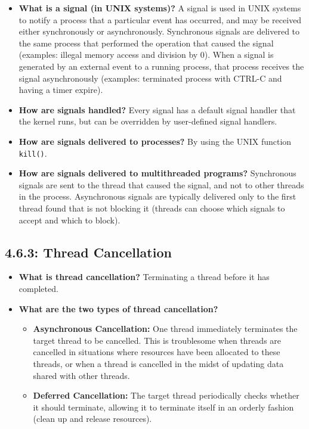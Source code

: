 \documentclass[12pt]{article}
\begin{document}
\begin{itemize}
    \item \textbf{What is a signal (in UNIX systems)?} A signal is used in UNIX systems to notify a process that a particular event has occurred, and may be received either synchronously or asynchronously. Synchronous signals are delivered to the same process that performed the operation that caused the signal (examples: illegal memory access and division by 0). When a signal is generated by an external event to a running process, that process receives the signal asynchronously (examples: terminated process with CTRL-C and having a timer expire).
    \item \textbf{How are signals handled?} Every signal has a default signal handler that the kernel runs, but can be overridden by user-defined signal handlers.
    \item \textbf{How are signals delivered to processes?} By using the UNIX function \texttt{kill()}.
    \item \textbf{How are signals delivered to multithreaded programs?} Synchronous signals are sent to the thread that caused the signal, and not to other threads in the process. Asynchronous signals are typically delivered only to the first thread found that is not blocking it (threads can choose which signals to accept and which to block).
\end{itemize}

\subsection*{4.6.3: Thread Cancellation}

\begin{itemize}
    \item \textbf{What is thread cancellation?} Terminating a thread before it has completed.
    \item \textbf{What are the two types of thread cancellation?}
        \begin{itemize}
            \item \textbf{Asynchronous Cancellation:} One thread immediately terminates the target thread to be cancelled. This is troublesome when threads are cancelled in situations where resources have been allocated to these threads, or when a thread is cancelled in the midst of updating data shared with other threads.
            \item \textbf{Deferred Cancellation:} The target thread periodically checks whether it should terminate, allowing it to terminate itself in an orderly fashion (clean up and release resources).
        \end{itemize}
\end{itemize}
\end{document}
